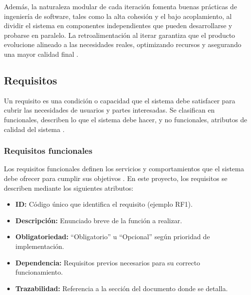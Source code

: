 \documentclass[12pt, a4paper]{article}
\begin{document}
		Además, la naturaleza modular de cada iteración fomenta buenas prácticas de ingeniería de software, tales como la alta cohesión y el bajo acoplamiento, al dividir el sistema en componentes independientes que pueden desarrollarse y probarse en paralelo. La retroalimentación al iterar garantiza que el producto evolucione alineado a las necesidades reales, optimizando recursos y asegurando una mayor calidad final \cite{wiegers}.
	
		\subsection{Requisitos}
		
		Un requisito es una condición o capacidad que el sistema debe satisfacer para cubrir las necesidades de usuarios y partes interesadas. Se clasifican en funcionales, describen lo que el sistema debe hacer, y no funcionales, atributos de calidad del sistema \cite{sommerville}.
	
			\subsubsection{Requisitos funcionales}
			
			Los requisitos funcionales definen los servicios y comportamientos que el sistema debe ofrecer para cumplir sus objetivos \cite{ieee830}. En este proyecto, los requisitos se describen mediante los siguientes atributos:
			
			\begin{itemize}
				\item \textbf{ID:} Código único que identifica el requisito (ejemplo RF1).
				\item \textbf{Descripción:} Enunciado breve de la función a realizar.
				\item \textbf{Obligatoriedad:} “Obligatorio” u “Opcional” según prioridad de implementación.
				\item \textbf{Dependencia:} Requisitos previos necesarios para su correcto funcionamiento.
				\item \textbf{Trazabilidad:} Referencia a la sección del documento donde se detalla.
			\end{itemize}
\end{document}
